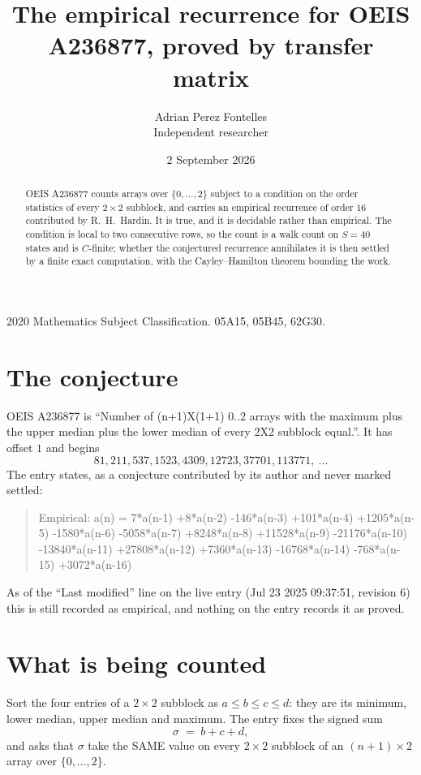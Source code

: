 \documentclass[11pt,a4paper]{article}
\title{The empirical recurrence for OEIS A236877, proved by transfer matrix}
\author{Adrian Perez Fontelles\\ \small Independent researcher}
\date{2 September 2026}
\theoremstyle{plain}
\theoremstyle{definition}
\begin{document}
\maketitle

\begin{abstract}
OEIS A236877 counts arrays over $\{0,\dots,2\}$ subject to a condition on the order
statistics of every $2\times2$ subblock, and carries an empirical recurrence of order
$16$ contributed by R.~H.~Hardin. It is true, and it is decidable rather than empirical.
The condition is local to two consecutive rows, so the count is a walk count on $S=40$
states and is $C$-finite; whether the conjectured recurrence annihilates it is then settled by
a finite exact computation, with the Cayley--Hamilton theorem bounding the work.
\end{abstract}

\noindent\small 2020 Mathematics Subject Classification. 05A15, 05B45, 62G30.\normalsize

\section{The conjecture}

OEIS A236877 is ``Number of (n+1)X(1+1) 0..2 arrays with the maximum plus the upper median plus the lower median of every 2X2 subblock equal.''. It has offset $1$ and begins
\[
81, 211, 537, 1523, 4309, 12723, 37701, 113771,\ \dots
\]
The entry states, as a conjecture contributed by its author and never marked settled:
\begin{quote}
Empirical: a(n) = 7*a(n-1) +8*a(n-2) -146*a(n-3) +101*a(n-4) +1205*a(n-5) -1580*a(n-6) -5058*a(n-7) +8248*a(n-8) +11528*a(n-9) -21176*a(n-10) -13840*a(n-11) +27808*a(n-12) +7360*a(n-13) -16768*a(n-14) -768*a(n-15) +3072*a(n-16)
\end{quote}
As of the ``Last modified'' line on the live entry (Jul 23 2025 09:37:51, revision 6) this is still
recorded as empirical, and nothing on the entry records it as proved.

\section{What is being counted}

Sort the four entries of a $2\times2$ subblock as $a\le b\le c\le d$: they
are its minimum, lower median, upper median and maximum. The entry fixes the signed sum
\[
\sigma\;=\;b+c+d,
\]
and asks that $\sigma$ take the SAME value on every $2\times2$ subblock of an
$(n+1)\times2$ array over $\{0,\dots,2\}$.
\end{document}
